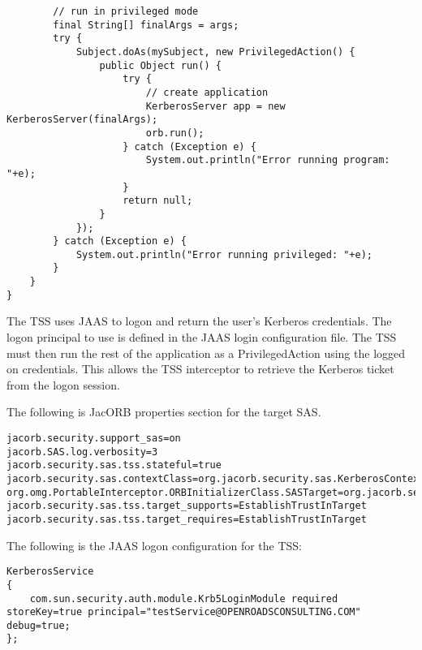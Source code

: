 \begin{scriptsize}
\begin{verbatim}
        // run in privileged mode
        final String[] finalArgs = args;
        try {
            Subject.doAs(mySubject, new PrivilegedAction() {
                public Object run() {
                    try {
                        // create application
                        KerberosServer app = new KerberosServer(finalArgs);
                        orb.run();
                    } catch (Exception e) {
                        System.out.println("Error running program: "+e);
                    }
                    return null;
                }
            });
        } catch (Exception e) {
            System.out.println("Error running privileged: "+e);
        }
    }
}
\end{verbatim}
\end{scriptsize}

The TSS uses JAAS to logon and return the user's Kerberos credentials. The
logon principal to use is defined in the JAAS login configuration file.
The TSS must then run the rest of the application as a PrivilegedAction using
the logged on credentials. This allows the TSS interceptor to retrieve the
Kerberos ticket from the logon session.

The following is JacORB properties section for the target SAS.

\begin{scriptsize}
\begin{verbatim}
jacorb.security.support_sas=on
jacorb.SAS.log.verbosity=3
jacorb.security.sas.tss.stateful=true
jacorb.security.sas.contextClass=org.jacorb.security.sas.KerberosContext
org.omg.PortableInterceptor.ORBInitializerClass.SASTarget=org.jacorb.security.sas.SASTargetInitializer
jacorb.security.sas.tss.target_supports=EstablishTrustInTarget
jacorb.security.sas.tss.target_requires=EstablishTrustInTarget
\end{verbatim}
\end{scriptsize}

The following is the JAAS logon configuration for the TSS:

\begin{scriptsize}
\begin{verbatim}
KerberosService 
{
    com.sun.security.auth.module.Krb5LoginModule required storeKey=true principal="testService@OPENROADSCONSULTING.COM" debug=true;
};
\end{verbatim}
\end{scriptsize}

